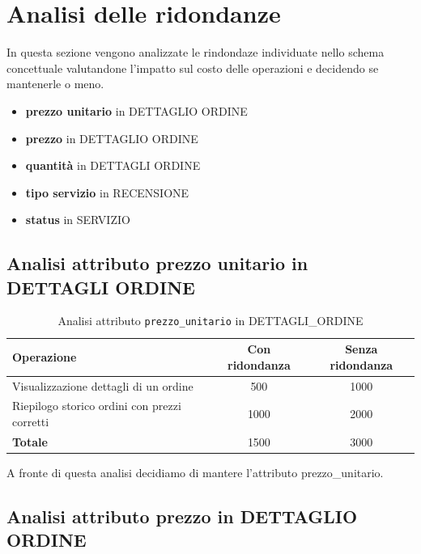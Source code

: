 \documentclass[a4paper,12pt]{report}
\begin{document}
\section{Analisi delle ridondanze}
In questa sezione vengono analizzate le rindondaze individuate nello schema concettuale valutandone l'impatto sul
costo delle operazioni e decidendo se mantenerle o meno.

\begin{itemize}
	\item \textbf{prezzo unitario} in DETTAGLIO ORDINE
	\item \textbf{prezzo} in DETTAGLIO ORDINE
	\item \textbf{quantità} in DETTAGLI ORDINE
	\item \textbf{tipo servizio} in RECENSIONE
	\item \textbf{status} in SERVIZIO
\end{itemize}

\subsection{Analisi attributo prezzo unitario in DETTAGLI ORDINE}

\begin{table}[H]
	\centering
	\begin{tabular}{|l|c|c|}
		\hline
		\textbf{Operazione}                          & \textbf{Con ridondanza} & \textbf{Senza ridondanza} \\
		\hline
		Visualizzazione dettagli di un ordine        & 500                     & 1000                      \\
		Riepilogo storico ordini con prezzi corretti & 1000                    & 2000                      \\
		\hline
		\textbf{Totale}                              & 1500                    & 3000                      \\
		\hline
	\end{tabular}
	\caption{Analisi attributo \texttt{prezzo\_unitario} in DETTAGLI\_ORDINE}
\end{table}

A fronte di questa analisi decidiamo di mantere l'attributo prezzo\_unitario.

\subsection{Analisi attributo prezzo in DETTAGLIO ORDINE}
\end{document}
